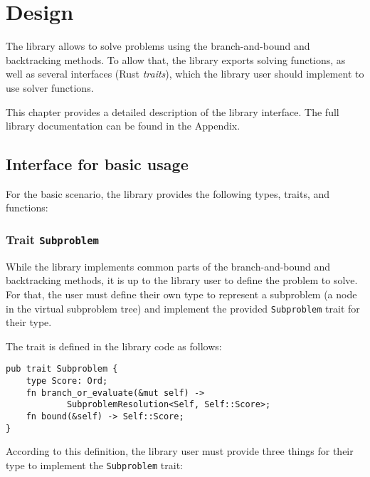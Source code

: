 \chapter{Design}
\label{chap:design}

The library allows to solve problems using the branch-and-bound and backtracking methods.
To allow that, the library exports solving functions, as well as several interfaces
(Rust \emph{traits}), which the library user should implement to use solver functions.

This chapter provides a detailed description of the library interface. The full library
documentation can be found in the Appendix.

\section{Interface for basic usage}

\label{sec:basic_usage}

For the basic scenario, the library provides the following types, traits, and functions:

\subsection{Trait \texttt{Subproblem}}

While the library implements common parts of the branch-and-bound and backtracking methods,
it is up to the library user to define the problem to solve. For that, the user must define
their own type to represent a subproblem (a node in the virtual subproblem tree) and implement
the provided \texttt{Subproblem} trait for their type.

The trait is defined in the library code as follows:

\begin{lstlisting}[caption=Trait \texttt{Subproblem}]
pub trait Subproblem {
    type Score: Ord;
    fn branch_or_evaluate(&mut self) ->
            SubproblemResolution<Self, Self::Score>;
    fn bound(&self) -> Self::Score;
}
\end{lstlisting}

According to this definition, the library user must provide three things for their type to
implement the \texttt{Subproblem} trait:

